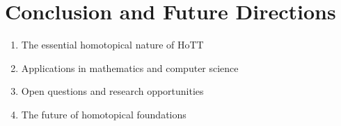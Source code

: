 \section{Conclusion and Future Directions}\label{sec:conc}

\begin{enumerate}
    \item The essential homotopical nature of HoTT
    \item Applications in mathematics and computer science
    \item Open questions and research opportunities
    \item The future of homotopical foundations
\end{enumerate}
